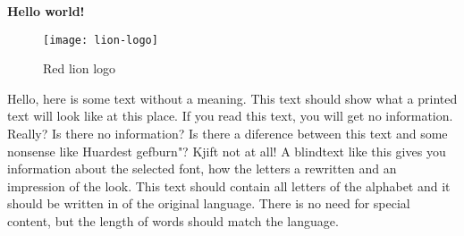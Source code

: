 \documentclass[../main.tex]{subfiles}
\begin{document}
\textbf{Hello world!}

\begin{figure}[bh]
\centering
\texttt{[image: lion-logo]}

\label{fig:img1}
\caption{Red lion logo}
\end{figure}

Hello, here is some text without a meaning.  This text should show what a printed text will look like at this place.  If you read this text, you will get no information.  Really?  Is there no information?  Is there a diference between this text and some nonsense like Huardest gefburn"?  Kjift  not at all!  A blindtext like this gives you information about the selected font, how the letters a rewritten and an impression of the look.  This text should contain all letters of the alphabet and it should be written in of the original language.  There is no need for special content, but the length of words should match the language.
\end{document}
